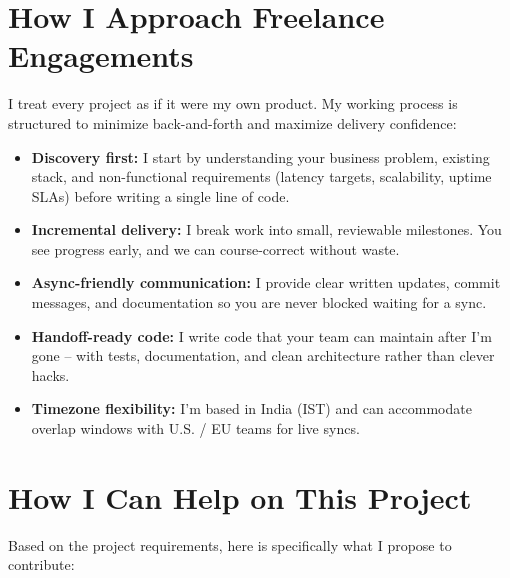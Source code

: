 \documentclass[11pt,letterpaper]{article}
\begin{document}
\section{How I Approach Freelance Engagements}

I treat every project as if it were my own product. My working process is structured to minimize back-and-forth and maximize delivery confidence:

\begin{itemize}[leftmargin=0.3in, noitemsep, topsep=2pt, partopsep=0pt, parsep=1pt]
    \item \textbf{Discovery first:} I start by understanding your business problem, existing stack, and non-functional requirements (latency targets, scalability, uptime SLAs) before writing a single line of code.
    \item \textbf{Incremental delivery:} I break work into small, reviewable milestones. You see progress early, and we can course-correct without waste.
    \item \textbf{Async-friendly communication:} I provide clear written updates, commit messages, and documentation so you are never blocked waiting for a sync.
    \item \textbf{Handoff-ready code:} I write code that your team can maintain after I'm gone -- with tests, documentation, and clean architecture rather than clever hacks.
    \item \textbf{Timezone flexibility:} I'm based in India (IST) and can accommodate overlap windows with U.S. / EU teams for live syncs.
\end{itemize}

\section{How I Can Help on This Project}

Based on the project requirements, here is specifically what I propose to contribute:
\end{document}

